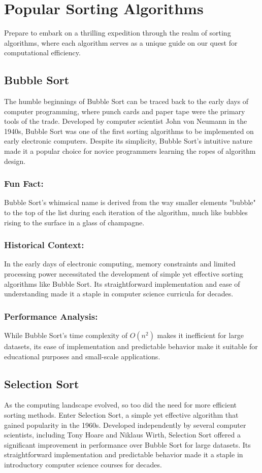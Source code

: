\documentclass{article}
\begin{document}
\section{Popular Sorting Algorithms}

Prepare to embark on a thrilling expedition through the realm of sorting algorithms, where each algorithm serves as a unique guide on our quest for computational efficiency.

\subsection{Bubble Sort}
The humble beginnings of Bubble Sort can be traced back to the early days of computer programming, where punch cards and paper tape were the primary tools of the trade. Developed by computer scientist John von Neumann in the 1940s, Bubble Sort was one of the first sorting algorithms to be implemented on early electronic computers. Despite its simplicity, Bubble Sort's intuitive nature made it a popular choice for novice programmers learning the ropes of algorithm design.

\subsubsection{Fun Fact:}
Bubble Sort's whimsical name is derived from the way smaller elements "bubble" to the top of the list during each iteration of the algorithm, much like bubbles rising to the surface in a glass of champagne.

\subsubsection{Historical Context:}
In the early days of electronic computing, memory constraints and limited processing power necessitated the development of simple yet effective sorting algorithms like Bubble Sort. Its straightforward implementation and ease of understanding made it a staple in computer science curricula for decades.

\subsubsection{Performance Analysis:}
While Bubble Sort's time complexity of \(O(n^2)\) makes it inefficient for large datasets, its ease of implementation and predictable behavior make it suitable for educational purposes and small-scale applications.

\subsection{Selection Sort}
As the computing landscape evolved, so too did the need for more efficient sorting methods. Enter Selection Sort, a simple yet effective algorithm that gained popularity in the 1960s. Developed independently by several computer scientists, including Tony Hoare and Niklaus Wirth, Selection Sort offered a significant improvement in performance over Bubble Sort for large datasets. Its straightforward implementation and predictable behavior made it a staple in introductory computer science courses for decades.
\end{document}
